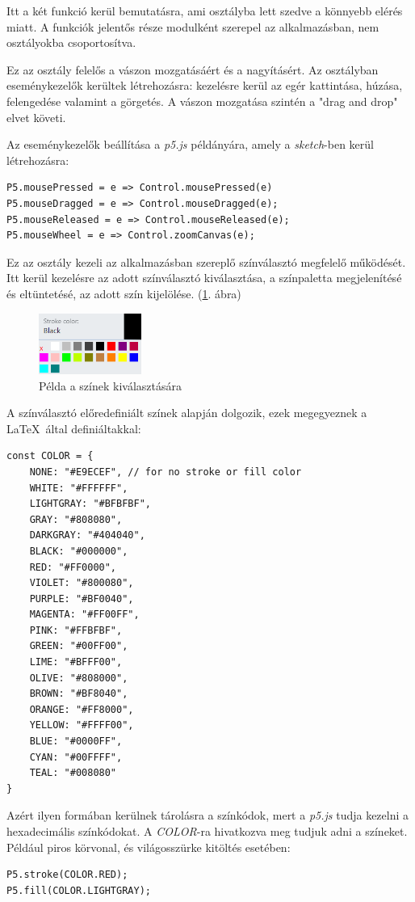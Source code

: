 
Itt a két funkció kerül bemutatásra, ami osztályba lett szedve a könnyebb elérés miatt. A funkciók jelentős része modulként szerepel az alkalmazásban, nem osztályokba csoportosítva.


Ez az osztály felelős a vászon mozgatásáért és a nagyításért. Az osztályban eseménykezelők kerültek létrehozásra: kezelésre kerül az egér kattintása, húzása, felengedése valamint a görgetés. A vászon mozgatása szintén a "drag and drop" elvet követi.

Az eseménykezelők beállítása a \textit{p5.js} példányára, amely a \textit{sketch}-ben kerül létrehozásra:

\begin{lstlisting}[style=es6, morekeywords={P5, Control}]
P5.mousePressed = e => Control.mousePressed(e)
P5.mouseDragged = e => Control.mouseDragged(e);
P5.mouseReleased = e => Control.mouseReleased(e);
P5.mouseWheel = e => Control.zoomCanvas(e);
\end{lstlisting}


Ez az osztály kezeli az alkalmazásban szereplő színválasztó megfelelő működését. Itt kerül kezelésre az adott színválasztó kiválasztása, a színpaletta megjelenítésé és eltüntetésé, az adott szín kijelölése.   (\ref{fig:cp2}. ábra)

\begin{figure}[!h]
	\centering
	\includegraphics[width=0.3\textwidth]{images/colorpicker.png}
	\caption{Példa a színek kiválasztására}
	\label{fig:cp2}
\end{figure}

A színválasztó előredefiniált színek alapján dolgozik, ezek megegyeznek a \LaTeX\ által definiáltakkal:

\begin{lstlisting}[style=es6]
const COLOR = {
	NONE: "#E9ECEF", // for no stroke or fill color
	WHITE: "#FFFFFF",
	LIGHTGRAY: "#BFBFBF",
	GRAY: "#808080",
	DARKGRAY: "#404040",
	BLACK: "#000000",
	RED: "#FF0000",
	VIOLET: "#800080",
	PURPLE: "#BF0040",
	MAGENTA: "#FF00FF",
	PINK: "#FFBFBF",
	GREEN: "#00FF00",
	LIME: "#BFFF00",
	OLIVE: "#808000",
	BROWN: "#BF8040",
	ORANGE: "#FF8000",
	YELLOW: "#FFFF00",
	BLUE: "#0000FF",
	CYAN: "#00FFFF",
	TEAL: "#008080"
}
\end{lstlisting}

Azért ilyen formában kerülnek tárolásra a színkódok, mert a \textit{p5.js} tudja kezelni a hexadecimális színkódokat. A \textit{COLOR}-ra hivatkozva meg tudjuk adni a színeket. Például piros körvonal, és világosszürke kitöltés esetében:
\begin{lstlisting}[style=es6, morekeywords={P5, COLOR}]
P5.stroke(COLOR.RED);
P5.fill(COLOR.LIGHTGRAY);
\end{lstlisting}